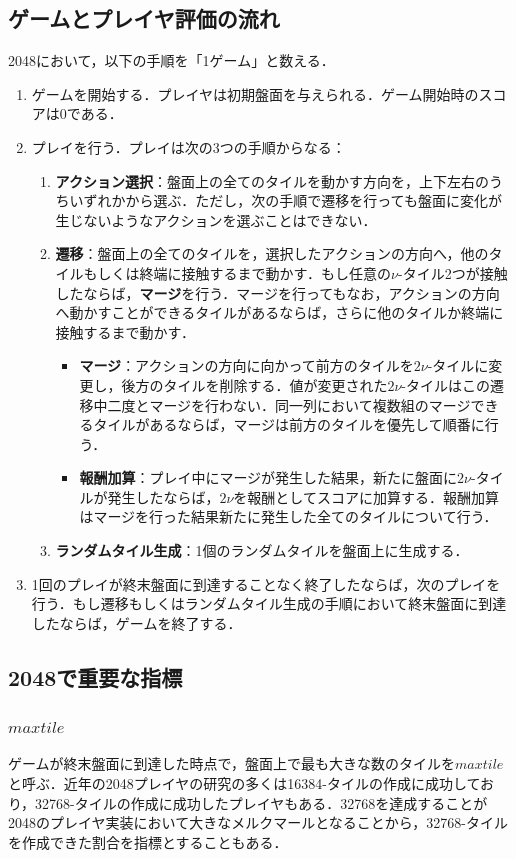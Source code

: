 \documentclass{suribt}
\begin{document}
\subsection{ゲームとプレイヤ評価の流れ}
2048において，以下の手順を「1ゲーム」と数える．

\begin{enumerate}
\item ゲームを開始する．プレイヤは初期盤面を与えられる．ゲーム開始時のスコアは0である．
\item プレイを行う．プレイは次の3つの手順からなる：
	\begin{enumerate}
	\item \textbf{アクション選択}：盤面上の全てのタイルを動かす方向を，上下左右のうちいずれかから選ぶ．ただし，次の手順で遷移を行っても盤面に変化が生じないようなアクションを選ぶことはできない．
	\item \textbf{遷移}：盤面上の全てのタイルを，選択したアクションの方向へ，他のタイルもしくは終端に接触するまで動かす．もし任意の${\nu}$-タイル2つが接触したならば，\textbf{マージ}を行う．マージを行ってもなお，アクションの方向へ動かすことができるタイルがあるならば，さらに他のタイルか終端に接触するまで動かす．
	\begin{itemize}
		\item \textbf{マージ}：アクションの方向に向かって前方のタイルを$2{\nu}$-タイルに変更し，後方のタイルを削除する．値が変更された$2{\nu}$-タイルはこの遷移中二度とマージを行わない．同一列において複数組のマージできるタイルがあるならば，マージは前方のタイルを優先して順番に行う．
		\item \textbf{報酬加算}：プレイ中にマージが発生した結果，新たに盤面に$2{\nu}$-タイルが発生したならば，$2{\nu}$を報酬としてスコアに加算する．報酬加算はマージを行った結果新たに発生した全てのタイルについて行う．
	\end{itemize}
	\item \textbf{ランダムタイル生成}：1個のランダムタイルを盤面上に生成する．
	\end{enumerate}
\item 1回のプレイが終末盤面に到達することなく終了したならば，次のプレイを行う．もし遷移もしくはランダムタイル生成の手順において終末盤面に到達したならば，ゲームを終了する．
\end{enumerate}

\subsection{2048で重要な指標}
\subsubsection{$max tile$}
ゲームが終末盤面に到達した時点で，盤面上で最も大きな数のタイルを$max tile$と呼ぶ．近年の2048プレイヤの研究の多くは16384-タイルの作成に成功しており，32768-タイルの作成に成功したプレイヤもある\cite{Jaskowski}．32768を達成することが2048のプレイヤ実装において大きなメルクマールとなることから，32768-タイルを作成できた割合を指標とすることもある\cite{Jaskowski}．
\end{document}
